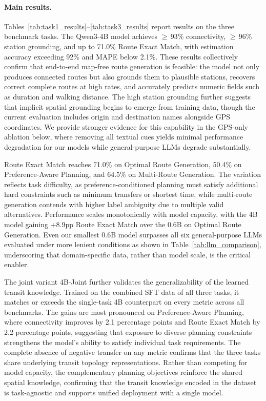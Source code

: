 \documentclass{llmxive}
\begin{document}
\paragraph{Main results.}
Tables~\ref{tab:task1_results}--\ref{tab:task3_results} report results on the three benchmark tasks. The Qwen3-4B model achieves $\geq$\,93\% connectivity, $\geq$\,96\% station grounding, and up to 71.0\% Route Exact Match, with estimation accuracy exceeding 92\% and MAPE below 2.1\%. These results collectively confirm that end-to-end map-free route generation is feasible: the model not only produces connected routes but also grounds them to plausible stations, recovers correct complete routes at high rates, and accurately predicts numeric fields such as duration and walking distance. The high station grounding further suggests that implicit spatial grounding begins to emerge from training data, though the current evaluation includes origin and destination names alongside GPS coordinates. We provide stronger evidence for this capability in the GPS-only ablation below, where removing all textual cues yields minimal performance degradation for our models while general-purpose LLMs degrade substantially.

Route Exact Match reaches 71.0\% on Optimal Route Generation, 50.4\% on Preference-Aware Planning, and 64.5\% on Multi-Route Generation. The variation reflects task difficulty, as preference-conditioned planning must satisfy additional hard constraints such as minimum transfers or shortest time, while multi-route generation contends with higher label ambiguity due to multiple valid alternatives. Performance scales monotonically with model capacity, with the 4B model gaining +8.9pp Route Exact Match over the 0.6B on Optimal Route Generation. Even our smallest 0.6B model surpasses all six general-purpose LLMs evaluated under more lenient conditions as shown in Table~\ref{tab:llm_comparison}, underscoring that domain-specific data, rather than model scale, is the critical enabler.

The joint variant 4B-Joint further validates the generalizability of the learned transit knowledge. Trained on the combined SFT data of all three tasks, it matches or exceeds the single-task 4B counterpart on every metric across all benchmarks. The gains are most pronounced on Preference-Aware Planning, where connectivity improves by 2.1 percentage points and Route Exact Match by 2.2 percentage points, suggesting that exposure to diverse planning constraints strengthens the model's ability to satisfy individual task requirements. The complete absence of negative transfer on any metric confirms that the three tasks share underlying transit topology representations. Rather than competing for model capacity, the complementary planning objectives reinforce the shared spatial knowledge, confirming that the transit knowledge encoded in the dataset is task-agnostic and supports unified deployment with a single model.
\end{document}
